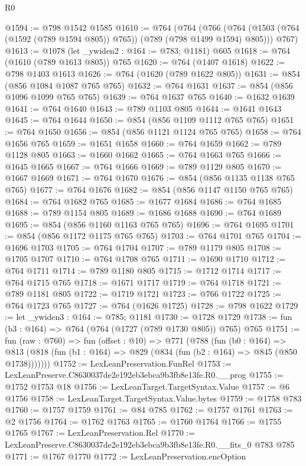 \begin{lexlean}{R0}
\begin{coremodule}
@1594 := @798 @1542 @1585
@1610 := @764
    (@764
      (@766 (@764 (@1503 (@764 (@1592 (@789 @1594 @805)) @765)) (@789 (@798 @1499 @1594) @805)))
      @767)
@1613 := @1078 (let _ywiden2 : @164 := @783; @1181) @605
@1618 := @764 (@1610 (@789 @1613 @805)) @765
@1620 := @764 (@1407 @1618)
@1622 := @798 @1403 @1613
@1626 := @764 (@1620 (@789 @1622 @805))
@1631 := @854 (@856 @1084 @1087 @765 @765)
@1632 := @764 @1631
@1637 := @854 (@856 @1096 @1099 @765 @765)
@1639 := @764 @1637 @765
@1640 := @1632 @1639
@1641 := @764 @1640
@1643 := @789 @1103 @805
@1644 := @1641 @1643
@1645 := @764 @1644
@1650 := @854 (@856 @1109 @1112 @765 @765)
@1651 := @764 @1650
@1656 := @854 (@856 @1121 @1124 @765 @765)
@1658 := @764 @1656 @765
@1659 := @1651 @1658
@1660 := @764 @1659
@1662 := @789 @1128 @805
@1663 := @1660 @1662
@1665 := @764 @1663 @765
@1666 := @1645 @1665
@1667 := @764 @1666
@1669 := @789 @1129 @805
@1670 := @1667 @1669
@1671 := @764 @1670
@1676 := @854 (@856 @1135 @1138 @765 @765)
@1677 := @764 @1676
@1682 := @854 (@856 @1147 @1150 @765 @765)
@1684 := @764 @1682 @765
@1685 := @1677 @1684
@1686 := @764 @1685
@1688 := @789 @1154 @805
@1689 := @1686 @1688
@1690 := @764 @1689
@1695 := @854 (@856 @1160 @1163 @765 @765)
@1696 := @764 @1695
@1701 := @854 (@856 @1172 @1175 @765 @765)
@1703 := @764 @1701 @765
@1704 := @1696 @1703
@1705 := @764 @1704
@1707 := @789 @1179 @805
@1708 := @1705 @1707
@1710 := @764 @1708 @765
@1711 := @1690 @1710
@1712 := @764 @1711
@1714 := @789 @1180 @805
@1715 := @1712 @1714
@1717 := @764 @1715 @765
@1718 := @1671 @1717
@1719 := @764 @1718
@1721 := @789 @1181 @805
@1722 := @1719 @1721
@1723 := @766 @1722
@1725 := @764 @1723 @765
@1727 := @764 (@1626 @1725)
@1728 := @798 @1622
@1729 := let _ywiden3 : @164 := @785; @1181
@1730 := @1728 @1729
@1738 := fun (b3 : @164) => @764 (@764 (@1727 (@789 @1730 @805)) @765) @765
@1751 := fun (raw : @760) =>
  fun (offset : @10) =>
  @771
    (@788
      (fun (b0 : @164) =>
      @813 (@818 (fun (b1 : @164) => @829 (@834 (fun (b2 : @164) => @845 (@850 @1738)))))))
@1752 := LexLeanPreservation.FunRel
@1753 := LexLeanPreserve.C8630037de2e192eb3ebca9b3fb8e13fe.R0.__prog
@1755 := @1752 @1753 @18
@1756 := LexLeanTarget.TargetSyntax.Value
@1757 := @6 @1756
@1758 := LexLeanTarget.TargetSyntax.Value.bytes
@1759 := @1758 @783
@1760 := @1757 @1759
@1761 := @84 @785
@1762 := @1757 @1761
@1763 := @2 @1756
@1764 := @1762 @1763
@1765 := @1760 @1764
@1766 := @1755 @1765
@1767 := LexLeanPreservation.Rel
@1770 := LexLeanPreserve.C8630037de2e192eb3ebca9b3fb8e13fe.R0.__fits_0 @783 @785
@1771 := @1767 @1770
@1772 := LexLeanPreservation.encOption

\end{coremodule}
\end{lexlean}
